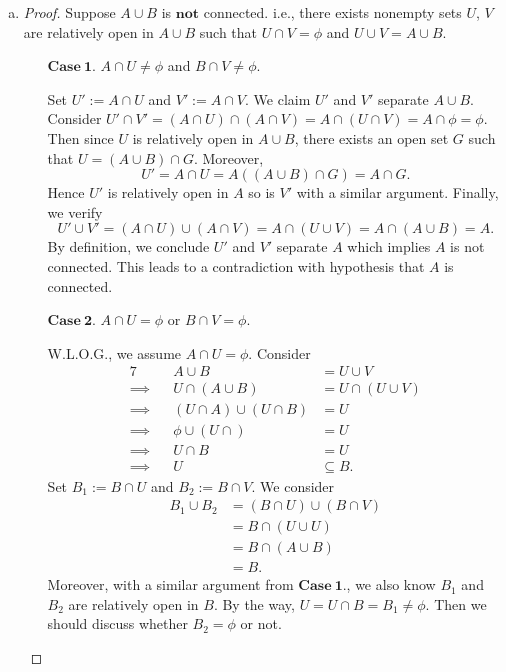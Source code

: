\begin{Exercise}
\begin{enumerate}[a)]
\item
\begin{proof}
Suppose $A\cup B$ is $\mathbf{not}$ connected. i.e., there exists nonempty sets $U$, $V$ are relatively open in $A\cup B$ such that $U\cap V=\phi$ and $U\cup V=A\cup B$.
\begin{enumerate}
\item [$\mathbf{Case\ 1.}$] 
$A\cap U\neq \phi$ and $B\cap V\neq \phi$.

\vspace{1ex}

Set $U' := A\cap U$ and $V' := A\cap V$. We claim $U'$ and $V'$ separate $A\cup B$. \\
Consider $U'\cap V' = (A\cap U)\cap (A\cap V) = A\cap (U\cap V) = A\cap \phi = \phi.$
Then since $U$ is relatively open in $A\cup B$, there exists an open set $G$ such that $U = (A\cup B)\cap G$. Moreover, 
$$
U'
= A\cap U
= A\left( (A\cup B)\cap G \right)
= A\cap G.
$$
Hence $U'$ is relatively open in $A$ so is $V'$ with a similar argument.
Finally, we verify
$$
U'\cup V'
= (A\cap U)\cup(A\cap V)
= A\cap (U\cup V)
= A\cap (A\cup B)
= A.
$$
By definition, we conclude $U'$ and $V'$ separate $A$ which implies $A$ is not connected. This leads to a contradiction with hypothesis that $A$ is connected.

\item [$\mathbf{Case\ 2.}$]
$A\cap U = \phi$ or $B\cap V = \phi$.

\vspace{1ex}

W.L.O.G., we assume $A\cap U = \phi$. Consider
\begin{alignat*}{7}
\quad&& A\cup B &= U\cup V \\
\implies&& U\cap(A\cup B) &= U\cap(U\cup V) \\
\implies&& (U\cap A)\cup (U\cap B) &= U \\
\implies&& \phi\cup(U\cap) &= U \\
\implies&& U\cap B &= U \\
\implies&& U &\subseteq B.
\end{alignat*}
Set $B_1 := B\cap U$ and $B_2 := B\cap V$.
We consider
\begin{align*}
B_1\cup B_2
&= (B\cap U) \cup (B\cap V) \\
&= B\cap(U\cup U) \\
&= B\cap(A\cup B) \\
&= B.
\end{align*}
Moreover, with a similar argument from $\mathbf{Case\ 1.}$, we also know $B_1$ and $B_2$ are relatively open in $B$. By the way, $U = U\cap B = B_1 \neq \phi$. Then we should discuss whether $B_2 = \phi$ or not.


\end{enumerate}
\end{proof}
\end{enumerate}
\end{Exercise}
